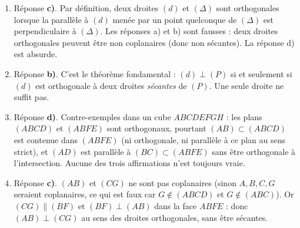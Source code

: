 \documentclass[11pt]{article}
\begin{document}
\begin{corrige}
\begin{enumerate}
\item Réponse \textbf{c)}. Par définition, deux droites $(d)$ et $(\Delta)$ sont orthogonales lorsque la parallèle à $(d)$ menée par un point quelconque de $(\Delta)$ est perpendiculaire à $(\Delta)$. Les réponses a) et b) sont fausses : deux droites orthogonales peuvent être non coplanaires (donc non sécantes). La réponse d) est absurde.
\item Réponse \textbf{b)}. C'est le théorème fondamental : $(d) \perp (P)$ si et seulement si $(d)$ est orthogonale à deux droites \emph{sécantes} de $(P)$. Une seule droite ne suffit pas.
\item Réponse \textbf{d)}. Contre-exemples dans un cube $ABCDEFGH$ : les plans $(ABCD)$ et $(ABFE)$ sont orthogonaux, pourtant $(AB) \subset (ABCD)$ est contenue dans $(ABFE)$ (ni orthogonale, ni parallèle à ce plan au sens strict), et $(AD)$ est parallèle à $(BC) \subset (ABFE)$ sans être orthogonale à l'intersection. Aucune des trois affirmations n'est toujours vraie.
\item Réponse \textbf{c)}. $(AB)$ et $(CG)$ ne sont pas coplanaires (sinon $A, B, C, G$ seraient coplanaires, ce qui est faux car $G \notin (ABCD)$ et $G \notin (ABC)$). Or $(CG) \parallel (BF)$ et $(BF) \perp (AB)$ dans la face $ABFE$ : donc $(AB) \perp (CG)$ au sens des droites orthogonales, sans être sécantes.
\end{enumerate}
\end{corrige}
\end{document}
